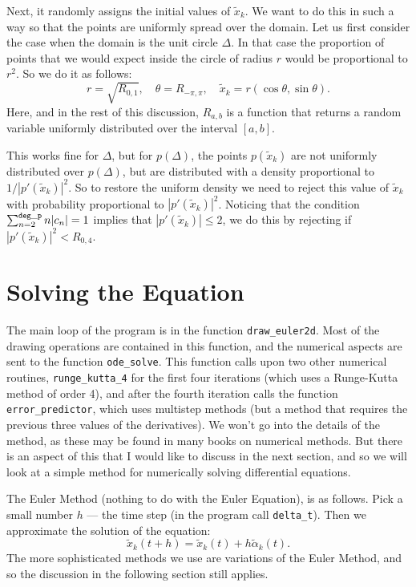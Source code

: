 \documentclass[12pt]{article}
\begin{document}
Next, it randomly assigns the initial values of $\tilde x_k$.  We want
to do this in such a way so that the points are uniformly spread over the
domain.  Let us first consider the case when the domain is the unit circle
$\Delta$.  In that case the proportion of points that we would expect
inside the circle of radius $r$ would be proportional to $r^2$.  So
we do it as follows:
\[ r = \sqrt{R_{0,1}},\quad \theta = R_{-\pi,\pi}, \quad
   \tilde x_k = r (\cos \theta, \sin \theta) .\]
Here, and in the rest of this discussion, $R_{a,b}$ is a function
that returns a random variable uniformly distributed over the interval
$[a,b]$.

This works fine for $\Delta$, but for $p(\Delta)$, the points 
$p(\tilde x_k)$ are not uniformly distributed over $p(\Delta)$,
but are distributed with a density proportional to
$1/|p'(\tilde x_k)|^2$.  So to restore the uniform density we need
to reject this value of $\tilde x_k$ with probability proportional
to $|p'(\tilde x_k)|^2$.  Noticing that the condition 
$\sum_{n=2}^{\tt deg\_p} n |c_n| = 1$ implies that 
$|p'(\tilde x_k)| \le 2$, we
do this by rejecting if $|p'(\tilde x_k)|^2 < R_{0,4}$.

\section{Solving the Equation}

The main loop of the program is in the function {\tt draw\_euler2d}.
Most of the drawing operations are contained in this function, and
the numerical aspects are sent to the function {\tt ode\_solve}.
This function calls upon two other numerical routines, 
{\tt runge\_kutta\_4} for the first four iterations (which
uses a Runge-Kutta method of order 4), and after the fourth
iteration calls the function {\tt error\_predictor}, which
uses multistep methods (but a method that requires the previous
three values of the derivatives).  We won't go into the details
of the method, as these may be found in many books on numerical
methods.  But there is an aspect of this that I would like
to discuss in the next section, and so we will look at a simple method for 
numerically solving differential equations.

The Euler Method
(nothing to do with the Euler Equation), is as
follows.  Pick a small number $h$ --- the time step (in
the program call {\tt delta\_t}).  Then we approximate
the solution of the equation:
\begin{equation}
\label{method-simple}
\tilde x_k(t+h) = \tilde x_k(t) + h \tilde\alpha_k(t) .
\end{equation}
The more sophisticated methods we use are variations of 
the Euler Method, and so the discussion in the following section
still applies.
\end{document}
